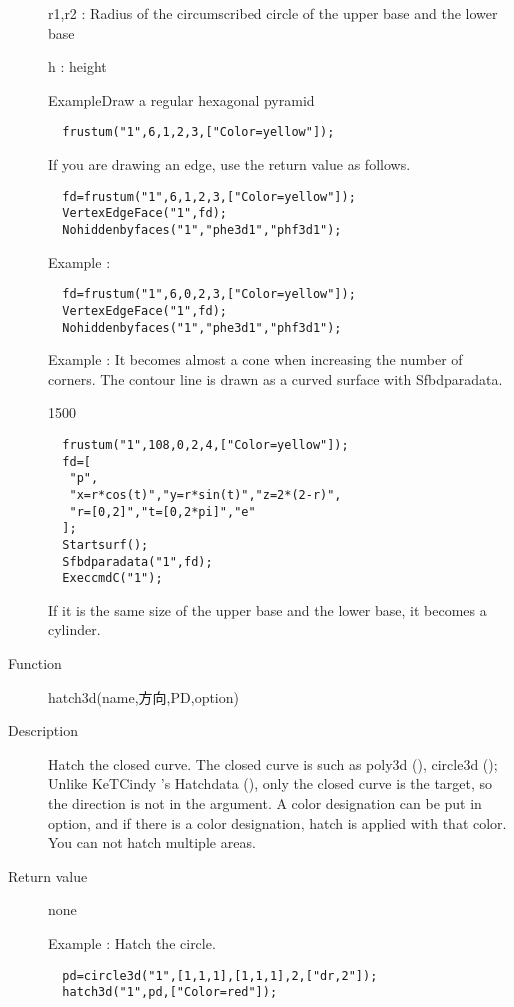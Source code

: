 \documentclass[papersize,a4paper,12pt]{article}
\begin{document}
\begin{description}
r1,r2 : Radius of the circumscribed circle of the upper base and the lower base

h : height

\vspace{\baselineskip}
 ExampleDraw a regular hexagonal pyramid

\verb|  frustum("1",6,1,2,3,["Color=yellow"]);| 

\hspace{20mm}

If you are drawing an edge, use the return value as follows.

\begin{verbatim}
  fd=frustum("1",6,1,2,3,["Color=yellow"]);
  VertexEdgeFace("1",fd);
  Nohiddenbyfaces("1","phe3d1","phf3d1");
\end{verbatim}

 Example :

\begin{verbatim}
  fd=frustum("1",6,0,2,3,["Color=yellow"]);
  VertexEdgeFace("1",fd);
  Nohiddenbyfaces("1","phe3d1","phf3d1");
\end{verbatim}

\hspace{20mm}

 Example :  It becomes almost a cone when increasing the number of corners. The contour line is drawn as a curved surface with Sfbdparadata.

\begin{layer}{150}{0}
\end{layer}

\begin{verbatim}
  frustum("1",108,0,2,4,["Color=yellow"]);
  fd=[
   "p",
   "x=r*cos(t)","y=r*sin(t)","z=2*(2-r)",
   "r=[0,2]","t=[0,2*pi]","e"
  ];
  Startsurf(); 
  Sfbdparadata("1",fd);
  ExeccmdC("1");
\end{verbatim}

If it is the same size of the upper base and the lower base, it becomes a cylinder.


\hypertarget{hatch3d}{}\item[Function] hatch3d(name,方向,PD,option)
\item[Description] Hatch the closed curve. The closed curve is such as poly3d (), circle3d ();
Unlike KeTCindy 's Hatchdata (), only the closed curve is the target, so the direction is not in the argument. A color designation can be put in option, and if there is a color designation, hatch is applied with that color. You can not hatch multiple areas.
\item[Return value] none

Example : Hatch the circle.
\begin{verbatim}
  pd=circle3d("1",[1,1,1],[1,1,1],2,["dr,2"]); 
  hatch3d("1",pd,["Color=red"]); 
\end{verbatim}

  

\newpage
\end{description}
\end{document}
